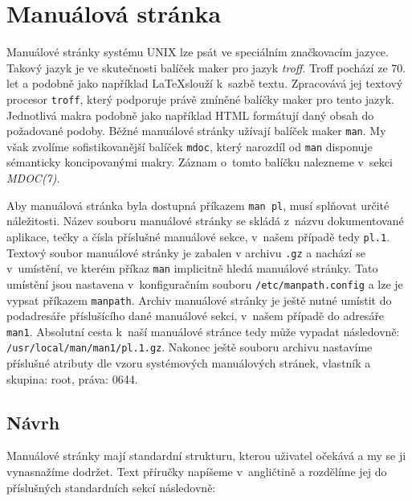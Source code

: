 \documentclass[thesis=B,czech,hidelinks]{FITthesis}[2012/06/26]
\begin{document}
\section{Manuálová stránka}

Manuálové stránky systému UNIX lze psát ve speciálním značkovacím jazyce. Takový jazyk je ve skutečnosti balíček maker pro jazyk \emph{troff}\cite{troff}. Troff pochází ze 70. let a podobně jako například \LaTeX slouží k~sazbě textu. Zpracovává jej textový procesor \texttt{troff}, který podporuje právě zmíněné balíčky maker pro tento jazyk. Jednotlivá makra podobně jako například HTML formátují daný obsah do požadované podoby. Běžné manuálové stránky užívají balíček maker \texttt{man}. My však zvolíme sofistikovanější balíček \texttt{mdoc}\cite{mdoc}, který narozdíl od \texttt{man} disponuje sémanticky koncipovanými makry. Záznam o~tomto balíčku nalezneme v~sekci \emph{MDOC(7)}.

Aby manuálová stránka byla dostupná příkazem \texttt{man pl}, musí splňovat určité náležitosti. Název souboru manuálové stránky se skládá z~názvu dokumentované aplikace, tečky a čísla příslušné manuálové sekce, v~našem případě tedy \texttt{pl.1}. Textový soubor manuálové stránky je zabalen v archivu \texttt{.gz} a nachází se v~umístění, ve kterém příkaz \texttt{man} implicitně hledá manuálové stránky. Tato umístění jsou nastavena v~konfiguračním souboru \texttt{/etc/manpath.config} a lze je vypsat příkazem \texttt{manpath}. Archiv manuálové stránky je ještě nutné umístit do podadresáře příslušícího dané manuálové sekci, v~našem případě do adresáře \texttt{man1}. Absolutní cesta k~naší manuálové stránce tedy může vypadat následovně: \texttt{/usr/local/man/man1/pl.1.gz}. Nakonec ještě souboru archivu nastavíme příslušné atributy dle vzoru systémových manuálových stránek, vlastník a skupina: root, práva: 0644.

\subsection{Návrh}

Manuálové stránky mají standardní strukturu, kterou uživatel očekává a my se ji vynasnažíme dodržet. Text příručky napíšeme v~angličtině a rozdělíme jej do příslušných standardních sekcí následovně:
\end{document}
